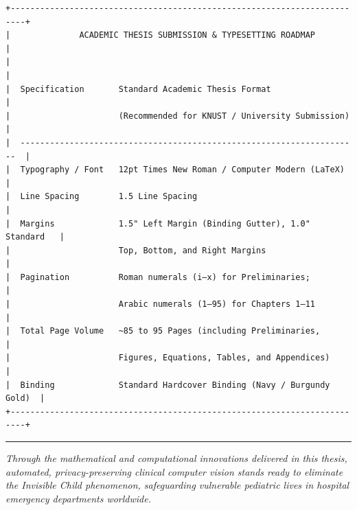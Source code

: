 \begin{verbatim}
+-------------------------------------------------------------------------+
|              ACADEMIC THESIS SUBMISSION & TYPESETTING ROADMAP           |
|                                                                         |
|  Specification       Standard Academic Thesis Format                    |
|                      (Recommended for KNUST / University Submission)     |
|  ---------------------------------------------------------------------  |
|  Typography / Font   12pt Times New Roman / Computer Modern (LaTeX)     |
|  Line Spacing        1.5 Line Spacing                                   |
|  Margins             1.5" Left Margin (Binding Gutter), 1.0" Standard   |
|                      Top, Bottom, and Right Margins                     |
|  Pagination          Roman numerals (i–x) for Preliminaries;             |
|                      Arabic numerals (1–95) for Chapters 1–11           |
|  Total Page Volume   ~85 to 95 Pages (including Preliminaries,          |
|                      Figures, Equations, Tables, and Appendices)        |
|  Binding             Standard Hardcover Binding (Navy / Burgundy Gold)  |
+-------------------------------------------------------------------------+
\end{verbatim}

\begin{center}\rule{0.5\linewidth}{0.5pt}\end{center}

\emph{Through the mathematical and computational innovations delivered
in this thesis, automated, privacy-preserving clinical computer vision
stands ready to eliminate the Invisible Child phenomenon, safeguarding
vulnerable pediatric lives in hospital emergency departments worldwide.}
